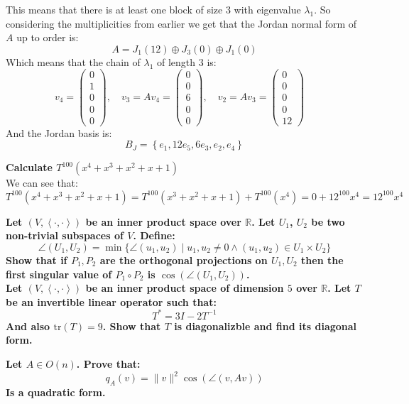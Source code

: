 \documentclass[11pt,a4paper]{article}
\theoremstyle{plain}
\newcommand{\tr}{\text{tr}}
\newcommand{\R}{\mathbb{R}}
\newcommand{\ip}[2]{\left\langle #1, #2 \right\rangle}
\begin{document}
	This means that there is at least one block of size $3$ with eigenvalue
	$\lambda_1$. So considering the multiplicities from earlier we get that
	the Jordan normal form of $A$ up to order is:
	\[
		A = J_1(12) \oplus J_3(0) \oplus J_1(0)
	\]
	Which means that the chain of $\lambda_1$ of length $3$ is:
	\[
		v_4 = \begin{pmatrix} 0 \\ 1 \\ 0 \\ 0 \\ 0 \end{pmatrix}, \quad
		v_3 = Av_4 = \begin{pmatrix} 0 \\ 0 \\ 6 \\ 0 \\ 0 \end{pmatrix}, \quad
		v_2 = Av_3 = \begin{pmatrix} 0 \\ 0 \\ 0 \\ 0 \\ 12 \end{pmatrix} \quad
	\]
	And the Jordan basis is:
	\[
		B_J = 
		\left\{
			e_1, 12e_5, 6e_3, e_2, e_4
		\right\}
	\]
	
	\newpage
	\noindent
	\textbf{Calculate $T^{100}(x^4+x^3+x^2+x+1)$} \\
	We can see that:
	\[
		T^{100}(x^4+x^3+x^2+x+1) = 
		T^{100}(x^3+x^2+x+1) + 
		T^{100}(x^4) = 
		0 + 12^{100}x^4 = 
		12^{100}x^4
	\]
	
	\newpage
	\noindent
	\textbf{Let $(V, \ip{\cdot}{\cdot})$ be an inner product space over $\R$.
	Let $U_1$, $U_2$ be two non-trivial subspaces of $V$. Define:
	\[
		\angle(U_1,U_2) = 
		\min\{\angle(u_1,u_2) \mid 
		u_1,u_2 \neq 0 \land (u_1,u_2)\in U_1 \times U_2\}
	\]
	Show that if $P_1,P_2$ are the orthogonal projections on $U_1,U_2$ then
	the first singular value of $P_1 \circ P_2$ is $\cos(\angle (U_1,U_2))$.} \\
	
	\newpage
	\noindent
	\textbf{Let $(V, \ip{\cdot}{\cdot})$ be an inner product space
	of dimension $5$ over $\R$. Let $T$ be an invertible linear operator such
	that:
	\[
		T^* = 3I - 2T^{-1}
	\]
	And also $\tr(T)=9$. Show that $T$ is diagonalizble and find its 
	diagonal form.}
	
	\newpage
	\noindent
	\textbf{Let $A \in O(n)$. Prove that:
	\[
		q_A(v) = \|v\|^2\cos(\angle(v,Av))
	\]
	Is a quadratic form.} \\
	
\end{document}
